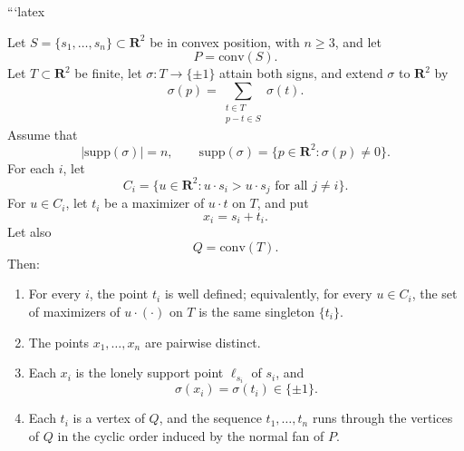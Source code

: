 ```latex
\begin{lemma}
Let $S=\{s_1,\ldots,s_n\}\subset \mathbf{R}^2$ be in convex position, with $n\ge 3$, and let
\[
P=\mathrm{conv}(S).
\]
Let $T\subset \mathbf{R}^2$ be finite, let $\sigma:T\to\{\pm1\}$ attain both signs, and extend $\sigma$ to $\mathbf{R}^2$ by
\[
\sigma(p)=\sum_{\substack{t\in T\\ p-t\in S}}\sigma(t).
\]
Assume that
\[
|\mathrm{supp}(\sigma)|=n,
\qquad
\mathrm{supp}(\sigma)=\{p\in \mathbf{R}^2:\sigma(p)\neq 0\}.
\]
For each $i$, let
\[
C_i=\{u\in \mathbf{R}^2:u\cdot s_i>u\cdot s_j \mbox{ for all } j\neq i\}.
\]
For $u\in C_i$, let $t_i$ be a maximizer of $u\cdot t$ on $T$, and put
\[
x_i=s_i+t_i.
\]
Let also
\[
Q=\mathrm{conv}(T).
\]
Then:
\begin{enumerate}
\item[(a)] For every $i$, the point $t_i$ is well defined; equivalently, for every $u\in C_i$, the set of maximizers of $u\cdot(\cdot)$ on $T$ is the same singleton $\{t_i\}$.
\item[(b)] The points $x_1,\ldots,x_n$ are pairwise distinct.
\item[(c)] Each $x_i$ is the lonely support point $\ell_{s_i}$ of $s_i$, and
\[
\sigma(x_i)=\sigma(t_i)\in\{\pm1\}.
\]
\item[(d)] Each $t_i$ is a vertex of $Q$, and the sequence $t_1,\ldots,t_n$ runs through the vertices of $Q$ in the cyclic order induced by the normal fan of $P$.
\end{enumerate}
\end{lemma}


